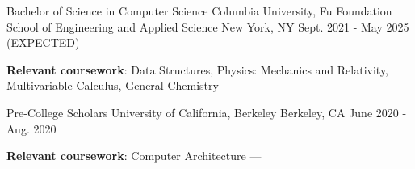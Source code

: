 
\begin{cventries}
  \cventry
  {Bachelor of Science in Computer Science} %
  {Columbia University, Fu Foundation School of Engineering and Applied Science} %
  {New York, NY} %
  {Sept. 2021 - May 2025 (EXPECTED)} %
  {
    \begin{cvitems} %
      \item {\textbf{Relevant coursework}: Data Structures, Physics: Mechanics and Relativity, Multivariable Calculus, General Chemistry --- }
    \end{cvitems}
  }

  \cventry
  {Pre-College Scholars} %
  {University of California, Berkeley} %
  {Berkeley, CA} %
  {June 2020 - Aug. 2020} %
  {
    \begin{cvitems} %
      \item {\textbf{Relevant coursework}: Computer Architecture --- }
    \end{cvitems}
  }
\end{cventries}
